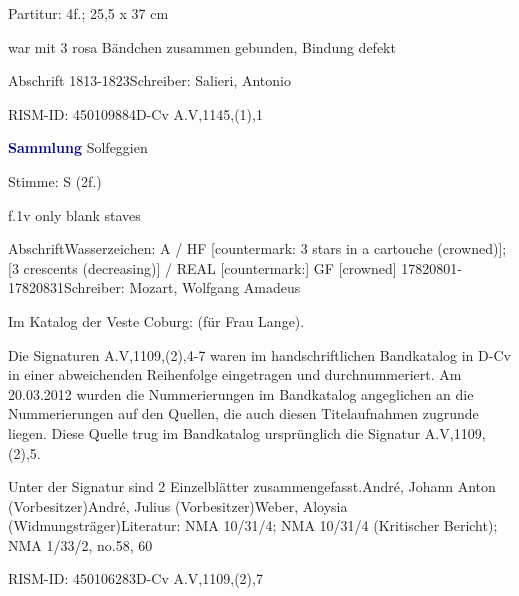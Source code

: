 \documentclass[a4paper, twocolumn, 11pt]{book}
\begin{document}
\par \begin{itshape}\end{itshape} 
\par \textcolor{darkblue}{}  Partitur: 4f.; 25,5 x 37 cm\newline \begin{small} war mit 3 rosa Bändchen zusammen gebunden, Bindung defekt\end{small} \newline Abschrift  1813-1823\newline Schreiber: Salieri, Antonio
\par RISM-ID: 450109884\newline D-Cv  A.V,1145,(1),1
\par \vspace{16pt} \textcolor{darkblue}{\textbf{Sammlung}}\hfillplus{[82]} Solfeggien
\par \begin{itshape}\end{itshape} 
\par \textcolor{darkblue}{}  Stimme: S  (2f.)\newline \begin{small} f.1v only blank staves\end{small} \newline Abschrift\newline Wasserzeichen: A / HF [countermark: 3 stars in a cartouche (crowned)]; [3 crescents (decreasing)] / REAL [countermark:] GF [crowned]  17820801-17820831\newline Schreiber: Mozart, Wolfgang Amadeus
\par Im Katalog der Veste Coburg: {\textquotedbl}(für Frau Lange){\textquotedbl}.
\par Die Signaturen A.V,1109,(2),4-7 waren im handschriftlichen Bandkatalog in D-Cv in einer abweichenden Reihenfolge eingetragen und durchnummeriert. Am 20.03.2012 wurden die Nummerierungen im Bandkatalog angeglichen an die Nummerierungen auf den Quellen, die auch diesen Titelaufnahmen zugrunde liegen. Diese Quelle trug im Bandkatalog ursprünglich die Signatur A.V,1109,(2),5.
\par Unter der Signatur sind 2 Einzelblätter zusammengefasst.\newline André, Johann Anton  (Vorbesitzer)\newline André, Julius  (Vorbesitzer)\newline Weber, Aloysia  (Widmungsträger)\newline Literatur: NMA  10/31/4; NMA  10/31/4 (Kritischer Bericht); NMA  1/33/2, no.58, 60
\par RISM-ID: 450106283\newline D-Cv  A.V,1109,(2),7
    \clearpage  
\end{document}
